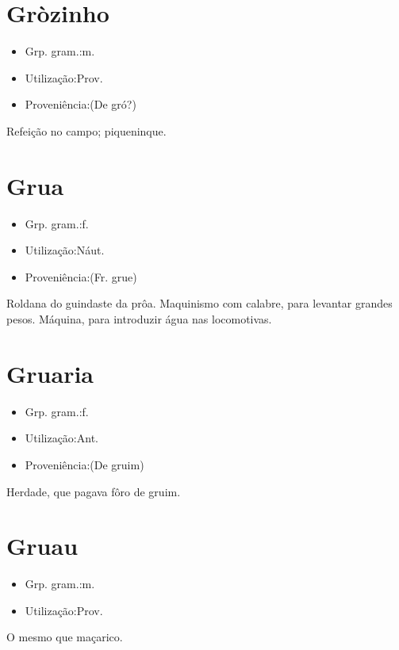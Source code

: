 \section{Gròzinho}
\begin{itemize}
\item {Grp. gram.:m.}
\end{itemize}
\begin{itemize}
\item {Utilização:Prov.}
\end{itemize}
\begin{itemize}
\item {Proveniência:(De \textunderscore gró?\textunderscore )}
\end{itemize}
Refeição no campo; piqueninque.
\section{Grua}
\begin{itemize}
\item {Grp. gram.:f.}
\end{itemize}
\begin{itemize}
\item {Utilização:Náut.}
\end{itemize}
\begin{itemize}
\item {Proveniência:(Fr. \textunderscore grue\textunderscore )}
\end{itemize}
Roldana do guindaste da prôa.
Maquinismo com calabre, para levantar grandes pesos.
Máquina, para introduzir água nas locomotivas.
\section{Gruaria}
\begin{itemize}
\item {Grp. gram.:f.}
\end{itemize}
\begin{itemize}
\item {Utilização:Ant.}
\end{itemize}
\begin{itemize}
\item {Proveniência:(De \textunderscore gruim\textunderscore )}
\end{itemize}
Herdade, que pagava fôro de gruim.
\section{Gruau}
\begin{itemize}
\item {Grp. gram.:m.}
\end{itemize}
\begin{itemize}
\item {Utilização:Prov.}
\end{itemize}
O mesmo que \textunderscore maçarico\textunderscore .
